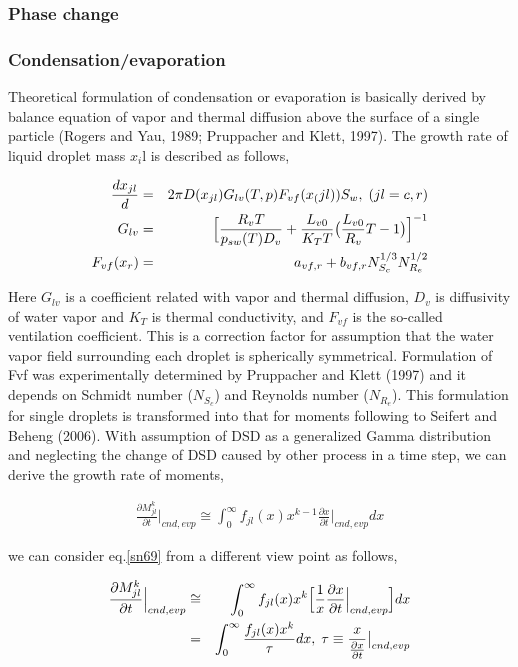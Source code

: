 \subsubsection{Phase change}
\subsubsection{Condensation/evaporation}
Theoretical formulation of condensation or evaporation is basically derived by balance equation of vapor and thermal diffusion above the surface of a single particle (Rogers and Yau, 1989; Pruppacher and Klett, 1997). The growth rate of liquid droplet mass $x_{i}$l is described as follows,

\begin{eqnarray}
\frac{dx_{jl}}{d}&=&2\pi D(x_{jl})G_{lv}(T,p)F_{vf}(x_(jl))S_{w},\; (jl=c,r)\label{sn66}\\
G_{lv}&=&\Bigl[\frac{R_{v}T}{p_{sw}(T)D_{v}}+\frac{L_{v0}}{K_{T}T}\bigl(\frac{L_{v0}}{R_{v}}{T}-1\bigr)\Bigr]^{-1}\label{sn67}\\
F_{vf}(x_{r})&=&a_{vf,r}+b_{vf,r}N_{S_{c}}^{1/3}N_{R_{e}}^{1/2}\label{sn68}
\end{eqnarray}

Here $G_{lv}$ is a coefficient related with vapor and thermal diffusion, $D_{v}$ is diffusivity of water vapor and $K_{T}$ is thermal conductivity, and $F_{vf}$ is the so-called ventilation coefficient. This is a correction factor for assumption that the water vapor field surrounding each droplet is spherically symmetrical. Formulation of Fvf was experimentally determined by Pruppacher and Klett (1997) and it depends on Schmidt number ($N_{S_{c}}$) and Reynolds number ($N_{R_{e}}$). This formulation for single droplets is transformed into that for moments following to Seifert and Beheng (2006). With assumption of DSD as a generalized Gamma distribution and neglecting the change of DSD caused by other process in a time step, we can derive the growth rate of moments,

\begin{eqnarray}
\frac{\partial M_{jl}^{k}}{\partial t}\Bigr|_{cnd,evp}\cong \int_{0}^{\infty}f_{jl}(x)x^{k-1}\frac{\partial x}{\partial t}\Bigr|_{cnd,evp}dx\label{sn69}
\end{eqnarray}

we can consider eq.\ref{sn69} from a different view point as follows,

\begin{eqnarray}
\frac{\partial M_{jl}^{k}}{\partial t}\Bigr|_{cnd,evp}&\cong& \int_{0}^{\infty}f_{jl}(x)x^{k}\Bigl[\frac{1}{x}\frac{\partial x}{\partial t}\Bigr|_{cnd,evp}\Bigr]dx\label{sn69}\nonumber\\
&=&\int_{0}^{\infty}\frac{f_{jl}(x)x^{k}}{\tau}dx,\;\tau\equiv\frac{x}{\frac{\partial x}{\partial t}}\bigr|_{cnd,evp}\label{sn70}
\end{eqnarray}

